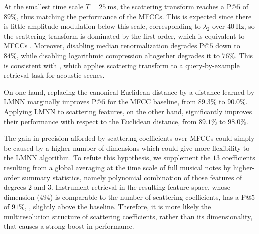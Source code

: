 At the smallest time scale $T=\SI{25}{\milli\second}$, the scattering transform reaches a P@$5$ of $89\%$, thus matching the performance of the MFCCs.
This is expected since there is little amplitude modulation below this scale, corresponding to $\lambda_2$ over $\SI{40}{\Hz}$, so the scattering transform is dominated by the first order, which is equivalent to MFCCs \cite{anden2014taslp}.
Moreover, disabling median renormalization degrades P@$5$ down to $84\%$, while disabling logarithmic compression altogether degrades it to $76\%$.
This is consistent with \cite{lostanlen2018eurasip}, which applies scattering transform to a query-by-example retrieval task for acoustic scenes.

On one hand, replacing the canonical Euclidean distance by a distance learned by LMNN marginally improves P@$5$ for the MFCC baseline, from $89.3\%$ to $90.0\%$.
Applying LMNN to scattering features, on the other hand, significantly improves their performance with respect to the Euclidean distance, from $89.1\%$ to $98.0\%$.

The gain in precision afforded by scattering coefficients over MFCCs could simply be caused by a higher number of dimensions which could give more flexibility to the LMNN algorithm. To refute this hypothesis, we supplement the $13$ coefficients resulting from a global averaging at the time scale of full musical notes by higher-order summary statistics, namely polynomial combination of those features of degrees $2$ and $3$.
Instrument retrieval in the resulting feature space, whose dimension ($494$) is comparable to the number of scattering coefficients, has a P@$5$ of $91\%$, \ie{}, slightly above the baseline.
Therefore, it is more likely the multiresolution structure of scattering coefficients, rather than its dimensionality, that causes a strong boost in performance.

